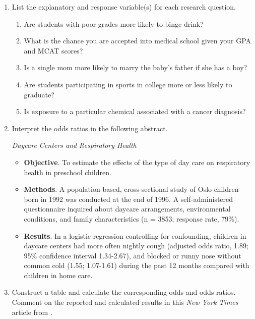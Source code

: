 \documentclass[
]{krantz}
\providecommand{\tightlist}{%
  \setlength{\itemsep}{0pt}\setlength{\parskip}{0pt}}
\begin{document}
\begin{enumerate}
\def\labelenumi{\arabic{enumi}.}
\item
  List the explanatory and response variable(s) for each research question.

  \begin{enumerate}
  \def\labelenumii{\alph{enumii}.}
  \tightlist
  \item
    Are students with poor grades more likely to binge drink?
  \item
    What is the chance you are accepted into medical school given your GPA and MCAT scores?
  \item
    Is a single mom more likely to marry the baby's father if she has a boy?
  \item
    Are students participating in sports in college more or less likely to graduate?
  \item
    Is exposure to a particular chemical associated with a cancer diagnosis?
  \end{enumerate}
\item
  Interpret the odds ratios in the following abstract.

  \emph{Daycare Centers and Respiratory Health} \citep{Nafstad1999}

  \begin{itemize}
  \item
    \textbf{Objective}. To estimate the effects of the type of day care on respiratory health in preschool children.
  \item
    \textbf{Methods}. A population-based, cross-sectional study of Oslo children born in 1992 was conducted at the end of 1996. A self-administered questionnaire inquired about daycare arrangements, environmental conditions, and family characteristics (n = 3853; response rate, 79\%).
  \item
    \textbf{Results}. In a logistic regression controlling for confounding, children in daycare centers had more often nightly cough (adjusted odds ratio, 1.89; 95\% confidence interval 1.34-2.67), and blocked or runny nose without common cold (1.55; 1.07-1.61) during the past 12 months compared with children in home care.
  \end{itemize}
\item
  Construct a table and calculate the corresponding odds and odds ratios. Comment on the reported and calculated results in this \emph{New York Times} article from \citet{Kolata2009}.


\end{enumerate}
\end{document}
